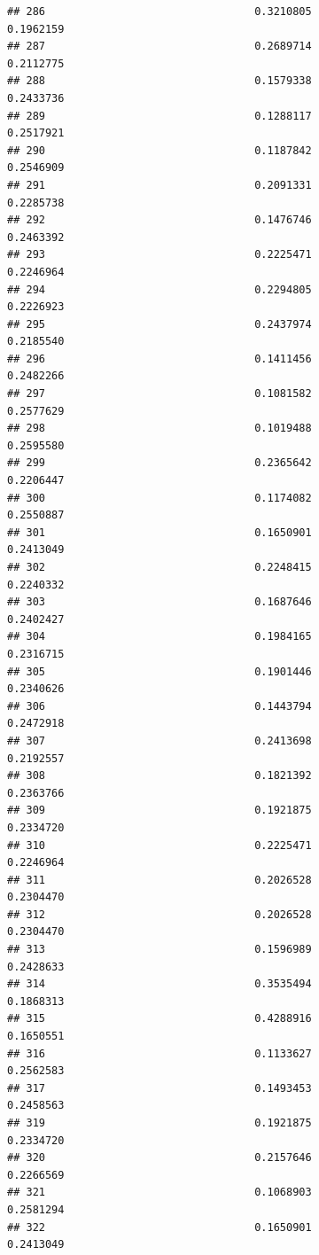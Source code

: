 \documentclass[
  american,
  man,floatsintext]{apa7}
\begin{document}
\begin{verbatim}
## 286                                 0.3210805               0.1962159
## 287                                 0.2689714               0.2112775
## 288                                 0.1579338               0.2433736
## 289                                 0.1288117               0.2517921
## 290                                 0.1187842               0.2546909
## 291                                 0.2091331               0.2285738
## 292                                 0.1476746               0.2463392
## 293                                 0.2225471               0.2246964
## 294                                 0.2294805               0.2226923
## 295                                 0.2437974               0.2185540
## 296                                 0.1411456               0.2482266
## 297                                 0.1081582               0.2577629
## 298                                 0.1019488               0.2595580
## 299                                 0.2365642               0.2206447
## 300                                 0.1174082               0.2550887
## 301                                 0.1650901               0.2413049
## 302                                 0.2248415               0.2240332
## 303                                 0.1687646               0.2402427
## 304                                 0.1984165               0.2316715
## 305                                 0.1901446               0.2340626
## 306                                 0.1443794               0.2472918
## 307                                 0.2413698               0.2192557
## 308                                 0.1821392               0.2363766
## 309                                 0.1921875               0.2334720
## 310                                 0.2225471               0.2246964
## 311                                 0.2026528               0.2304470
## 312                                 0.2026528               0.2304470
## 313                                 0.1596989               0.2428633
## 314                                 0.3535494               0.1868313
## 315                                 0.4288916               0.1650551
## 316                                 0.1133627               0.2562583
## 317                                 0.1493453               0.2458563
## 319                                 0.1921875               0.2334720
## 320                                 0.2157646               0.2266569
## 321                                 0.1068903               0.2581294
## 322                                 0.1650901               0.2413049

\end{verbatim}
\end{document}
